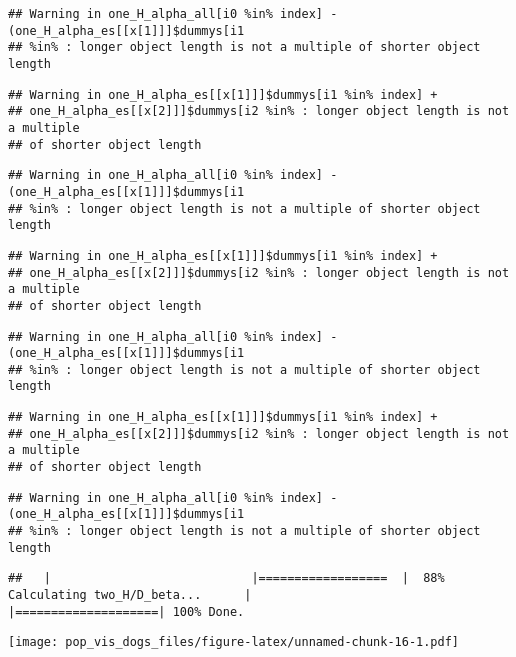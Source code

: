 \documentclass[
]{article}
\begin{document}
\begin{verbatim}
## Warning in one_H_alpha_all[i0 %in% index] - (one_H_alpha_es[[x[1]]]$dummys[i1
## %in% : longer object length is not a multiple of shorter object length
\end{verbatim}

\begin{verbatim}
## Warning in one_H_alpha_es[[x[1]]]$dummys[i1 %in% index] +
## one_H_alpha_es[[x[2]]]$dummys[i2 %in% : longer object length is not a multiple
## of shorter object length
\end{verbatim}

\begin{verbatim}
## Warning in one_H_alpha_all[i0 %in% index] - (one_H_alpha_es[[x[1]]]$dummys[i1
## %in% : longer object length is not a multiple of shorter object length
\end{verbatim}

\begin{verbatim}
## Warning in one_H_alpha_es[[x[1]]]$dummys[i1 %in% index] +
## one_H_alpha_es[[x[2]]]$dummys[i2 %in% : longer object length is not a multiple
## of shorter object length
\end{verbatim}

\begin{verbatim}
## Warning in one_H_alpha_all[i0 %in% index] - (one_H_alpha_es[[x[1]]]$dummys[i1
## %in% : longer object length is not a multiple of shorter object length
\end{verbatim}

\begin{verbatim}
## Warning in one_H_alpha_es[[x[1]]]$dummys[i1 %in% index] +
## one_H_alpha_es[[x[2]]]$dummys[i2 %in% : longer object length is not a multiple
## of shorter object length
\end{verbatim}

\begin{verbatim}
## Warning in one_H_alpha_all[i0 %in% index] - (one_H_alpha_es[[x[1]]]$dummys[i1
## %in% : longer object length is not a multiple of shorter object length
\end{verbatim}

\begin{verbatim}
##   |                            |==================  |  88% Calculating two_H/D_beta...      |                            |====================| 100% Done.
\end{verbatim}

\texttt{[image: pop\_vis\_dogs\_files/figure-latex/unnamed-chunk-16-1.pdf]}
\end{document}

